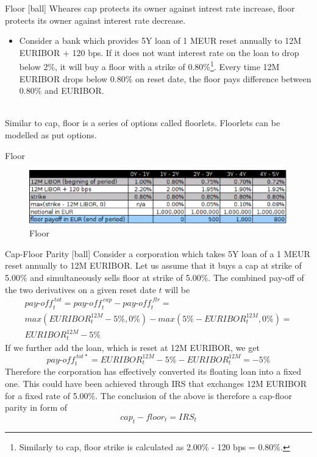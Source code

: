 \documentclass{beamer}
\begin{document}
\begin{frame}{Floor}
[ball]
Wheares cap protects its owner against intrest rate increase, floor protects its owner against interest rate decrease.
\begin{itemize}
	\item Consider a bank which provides 5Y loan of 1 MEUR reset annually to 12M EURIBOR + 120 bps. If it does not want interest rate on the loan to drop below 2\%, it will buy a floor with a strike of 0.80\%\footnote{\tiny{Similarly to cap, floor strike is calculated as 2.00\% - 120 bps = 0.80\%.}}. Every time 12M EURIBOR drops below 0.80\% on reset date, the floor pays difference between 0.80\% and EURIBOR.
\end{itemize}

\mbox{}\\
Similar to cap, floor is a series of options called floorlets. Floorlets can be modelled as put options.
\end{frame}

\begin{frame}{Floor}
\begin{figure}[htp]
\centering
\includegraphics[scale = 0.50]{floor.eps}
\caption{Floor}
\label{floor}
\end{figure}
\end{frame}

\begin{frame}{Cap-Floor Parity}
[ball]
Consider a corporation which takes 5Y loan of a 1 MEUR reset annually to 12M EURIBOR. Let us assume that it buys a cap at strike of 5.00\% and simultaneously sells floor at strike of 5.00\%. The combined pay-off of the two derivatives on a given reset date $t$ will be
\begin{multline}
\textit{pay-off}_t^{~tot} = \textit{pay-off}_t^{~cap} - \textit{pay-off}_t^{~flr} =\\
max(EURIBOR_t^{12M} - 5\%, 0\%) - max(5\% - EURIBOR_t^{12M}, 0\%) =\\
EURIBOR_t^{12M} - 5\% 
\end{multline}
If we further add the loan, which is reset at 12M EURIBOR, we get
\begin{equation}
\textit{pay-off}_t^{~tot*} = EURIBOR_t^{12M} - 5\% - EURIBOR_t^{12M} = -5\%
\end{equation}
Therefore the corporation has effectively converted its floating loan into a fixed one. This could have been achieved through IRS that exchanges 12M EURIBOR for a fixed rate of 5.00\%.
The conclusion of the above is therefore a cap-floor parity in form of
\begin{equation}
cap_t - floor_t = IRS_t
\end{equation}
\end{frame}
\end{document}
